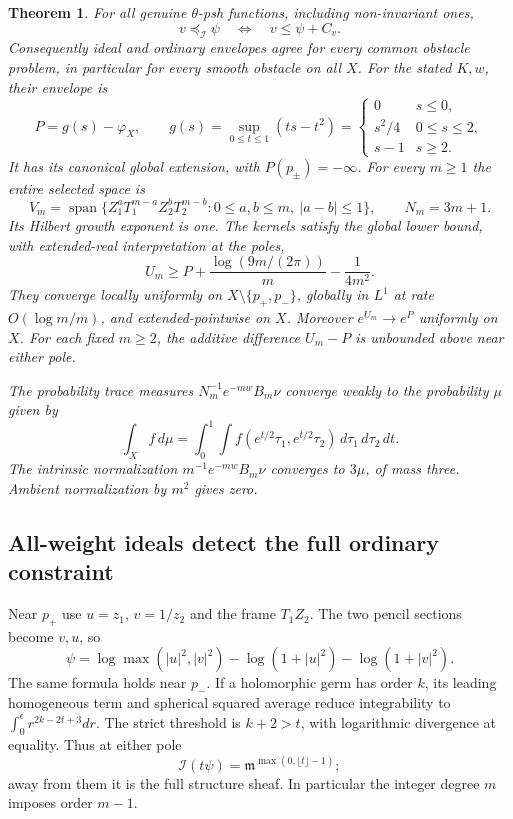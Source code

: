 \documentclass[11pt]{article}
\newtheorem{theorem}{Theorem}
\begin{document}
\begin{theorem}\label{thm:actual-ideal}
For all genuine $\theta$-psh functions, including non-invariant ones,
\[
 v\preceq_{\mathcal I}\psi\quad\Longleftrightarrow\quad
 v\leq\psi+C_v.
\]
Consequently ideal and ordinary envelopes agree for every common obstacle
problem, in particular for every smooth obstacle on all $X$.
For the stated $K,w$, their envelope is
\[
 P=g(s)-\varphi_X,\qquad
 g(s)=\sup_{0\leq t\leq1}(ts-t^2)
 =\begin{cases}0&s\leq0,\\s^2/4&0\leq s\leq2,\\s-1&s\geq2.\end{cases}
\]
It has its canonical global extension, with $P(p_\pm)=-\infty$.
For every $m\geq1$ the entire selected space is
\begin{equation}\label{eq:actual-three-bands}
 V_m=\operatorname{span}\{Z_1^aT_1^{m-a}Z_2^bT_2^{m-b}:
       0\leq a,b\leq m,\ |a-b|\leq1\},\qquad N_m=3m+1.
\end{equation}
Its Hilbert growth exponent is one. The kernels satisfy the global
lower bound, with extended-real interpretation at the poles,
\begin{equation}\label{eq:actual-lower}
 U_m\geq P+\frac{\log(9m/(2\pi))}{m}-\frac1{4m^2}.
\end{equation}
They converge locally uniformly on $X\setminus\{p_+,p_-\}$,
globally in $L^1$ at rate $O(\log m/m)$,
and extended-pointwise on $X$. Moreover $e^{U_m}\to e^P$
uniformly on $X$. For each fixed $m\geq2$, the additive difference
$U_m-P$ is unbounded above near either pole.

The probability trace measures $N_m^{-1}e^{-mw}B_m\nu$
converge weakly to the probability $\mu$ given by
\[
 \int_X f\,d\mu=\int_0^1\int f(e^{t/2}\tau_1,e^{t/2}\tau_2)
                         \,d\tau_1\,d\tau_2\,dt.
\]
The intrinsic normalization $m^{-1}e^{-mw}B_m\nu$ converges to
$3\mu$, of mass three. Ambient normalization by $m^2$ gives zero.
\end{theorem}

\subsection{All-weight ideals detect the full ordinary constraint}
Near $p_+$ use $u=z_1$, $v=1/z_2$ and the frame $T_1Z_2$.
The two pencil sections become $v,u$, so
\[
 \psi=\log\max(|u|^2,|v|^2)
            -\log(1+|u|^2)-\log(1+|v|^2).
\]
The same formula holds near $p_-$. If a holomorphic germ has order $k$,
its leading homogeneous term and spherical squared average reduce
integrability to $\int_0^\epsilon r^{2k-2t+3}dr$.
The strict threshold is $k+2>t$, with logarithmic divergence at equality.
Thus at either pole
\begin{equation}\label{eq:actual-local-ideal}
 \mathcal I(t\psi)=\mathfrak m^{\max(0,\lfloor t\rfloor-1)};
\end{equation}
away from them it is the full structure sheaf. In particular the
integer degree $m$ imposes order $m-1$.
\end{document}
